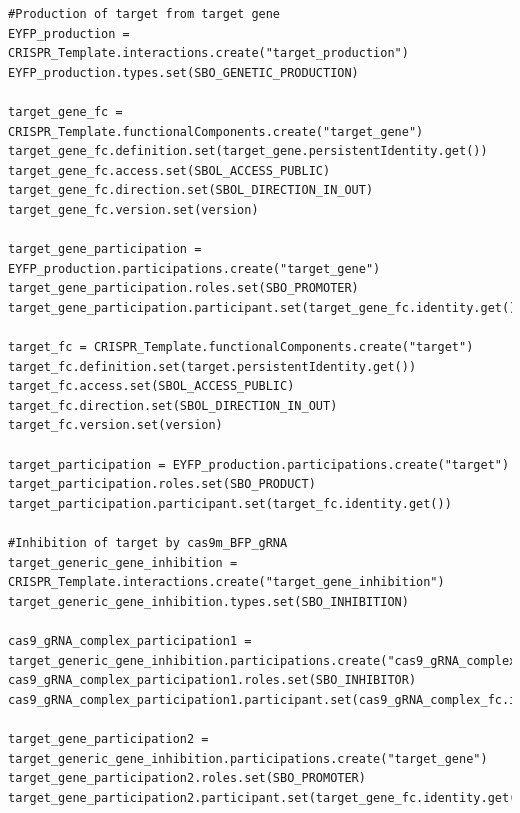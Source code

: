 \vspace{\abovedisplayskip}
\begin{minipage}{0.95\textwidth}%
\begin{lstlisting}
#Production of target from target gene
EYFP_production = CRISPR_Template.interactions.create("target_production")
EYFP_production.types.set(SBO_GENETIC_PRODUCTION)

target_gene_fc = CRISPR_Template.functionalComponents.create("target_gene")
target_gene_fc.definition.set(target_gene.persistentIdentity.get())
target_gene_fc.access.set(SBOL_ACCESS_PUBLIC)
target_gene_fc.direction.set(SBOL_DIRECTION_IN_OUT)
target_gene_fc.version.set(version)

target_gene_participation = EYFP_production.participations.create("target_gene")
target_gene_participation.roles.set(SBO_PROMOTER)
target_gene_participation.participant.set(target_gene_fc.identity.get())

target_fc = CRISPR_Template.functionalComponents.create("target")
target_fc.definition.set(target.persistentIdentity.get())
target_fc.access.set(SBOL_ACCESS_PUBLIC)
target_fc.direction.set(SBOL_DIRECTION_IN_OUT)
target_fc.version.set(version)

target_participation = EYFP_production.participations.create("target")
target_participation.roles.set(SBO_PRODUCT)
target_participation.participant.set(target_fc.identity.get())

#Inhibition of target by cas9m_BFP_gRNA 
target_generic_gene_inhibition = CRISPR_Template.interactions.create("target_gene_inhibition")
target_generic_gene_inhibition.types.set(SBO_INHIBITION)

cas9_gRNA_complex_participation1 = target_generic_gene_inhibition.participations.create("cas9_gRNA_complex")
cas9_gRNA_complex_participation1.roles.set(SBO_INHIBITOR)
cas9_gRNA_complex_participation1.participant.set(cas9_gRNA_complex_fc.identity.get())
	
target_gene_participation2 = target_generic_gene_inhibition.participations.create("target_gene")
target_gene_participation2.roles.set(SBO_PROMOTER)
target_gene_participation2.participant.set(target_gene_fc.identity.get())
\end{lstlisting}
\end{minipage}

